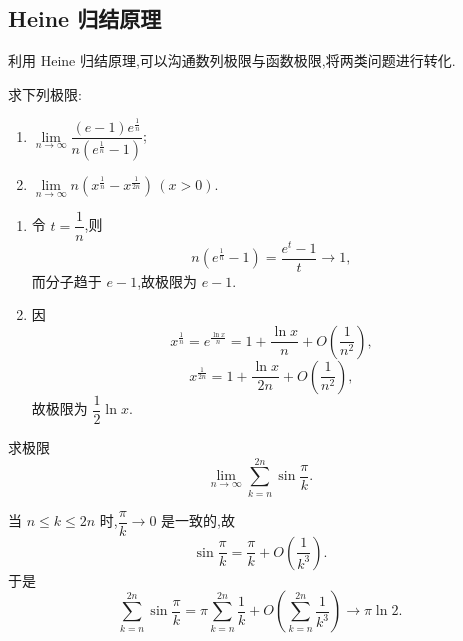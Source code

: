 \subsection{Heine 归结原理}

利用 Heine 归结原理,可以沟通数列极限与函数极限,将两类问题进行转化.

\begin{example}
    求下列极限:
    \begin{enumerate}
        \item $\displaystyle
                  \lim\limits_{n\to\infty}
                  \dfrac{(e-1)e^{\frac{1}{n}}}{n\left(e^{\frac{1}{n}}-1\right)}$;
        \item $\displaystyle
                  \lim\limits_{n\to\infty}
                  n\left(x^{\frac{1}{n}}-x^{\frac{1}{2n}}\right)\,(x>0)$.
    \end{enumerate}
\end{example}
\exampleblank

\begin{solution}
    \leavevmode
    \begin{enumerate}
        \item 令 $t=\dfrac{1}{n}$,则
              \[
                  n\left(e^{\frac{1}{n}}-1\right)=\dfrac{e^t-1}{t}\longrightarrow1,
              \]
              而分子趋于 $e-1$,故极限为 $e-1$.
        \item 因
              \[
                  x^{\frac{1}{n}}=e^{\frac{\ln x}{n}}
                  =1+\dfrac{\ln x}{n}+O\left(\dfrac{1}{n^2}\right),
              \]
              \[
                  x^{\frac{1}{2n}}
                  =1+\dfrac{\ln x}{2n}+O\left(\dfrac{1}{n^2}\right),
              \]
              故极限为 $\dfrac{1}{2}\ln x$.
    \end{enumerate}
\end{solution}

\begin{example}
    求极限
    \[
        \displaystyle\lim\limits_{n\to\infty}
        \sum\limits_{k=n}^{2n}\sin\dfrac{\pi}{k}.
    \]
\end{example}
\exampleblank

\begin{solution}
    当 $n\leq k\leq2n$ 时,$\dfrac{\pi}{k}\to0$ 是一致的,故
    \[
        \sin\dfrac{\pi}{k}=\dfrac{\pi}{k}+O\left(\dfrac{1}{k^3}\right).
    \]
    于是
    \[
        \displaystyle\sum\limits_{k=n}^{2n}\sin\dfrac{\pi}{k}
        =\pi\sum\limits_{k=n}^{2n}\dfrac{1}{k}
        +O\left(\sum\limits_{k=n}^{2n}\dfrac{1}{k^3}\right)
        \longrightarrow\pi\ln2.
    \]
\end{solution}

